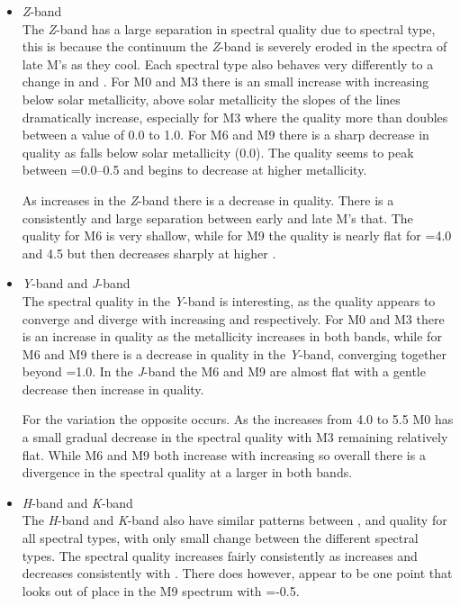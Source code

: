 \begin{itemize}
\item  \emph{Z}-band\\
The \emph{Z}-band has a large separation in spectral quality due to spectral type, this is because the continuum the \emph{Z}-band is severely eroded in the spectra of late M's as they cool.
Each spectral type also behaves very differently to a change in \feh{} and \Logg{}.
For {M0} and {M3} there is an small increase with increasing \feh{} below solar metallicity, above solar metallicity the slopes of the lines dramatically increase, especially for {M3} where the quality more than doubles between a \feh{} value of 0.0 to 1.0.
For {M6} and {M9} there is a sharp decrease in quality as \feh{} falls below solar metallicity (0.0). The quality seems to peak between \feh{}=0.0--0.5 and begins to decrease at higher metallicity.

As \Logg{} increases in the \emph{Z}-band there is a decrease in quality.
There is a consistently and large separation between early and late M's that.
The quality for {M6} is very shallow, while for {M9} the quality is nearly flat for \Logg{}=4.0 and 4.5 but then decreases sharply at higher \Logg{}.

\item \emph{Y}-band and \emph{J}-band \\
The spectral quality in the \emph{Y}-band is interesting, as the quality appears to converge and diverge with increasing \feh{} and \Logg{} respectively.
For {M0} and {M3} there is an increase in quality as the metallicity increases in both bands, while for {M6} and {M9} there is a decrease in quality in the \emph{Y}-band, converging together beyond \feh{}=1.0. In the \emph{J}-band the {M6} and {M9} are almost flat with a gentle decrease then increase in quality.

For the \Logg{} variation the opposite occurs.
As the \Logg{} increases from 4.0 to 5.5 {M0} has a small gradual decrease in the spectral quality with {M3} remaining relatively flat. While {M6} and {M9} both increase with increasing \Logg{} so overall there is a divergence in the spectral quality at a larger \Logg{} in both bands.

\item \emph{H}-band and \emph{K}-band \\
The \emph{H}-band and \emph{K}-band also have similar patterns between \feh{}, \Logg{} and quality for all spectral types, with only small change between the different spectral types.
The spectral quality increases fairly consistently as \feh{} increases and decreases consistently with \Logg{}.
There does however, appear to be one point that looks out of place in the {M9} spectrum with \feh{}=-0.5.

\end{itemize}

